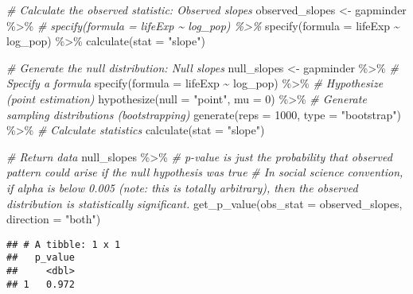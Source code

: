 \documentclass[
]{book}
\newenvironment{Shaded}{\begin{snugshade}}{\end{snugshade}}
\newcommand{\AttributeTok}[1]{\textcolor[rgb]{0.77,0.63,0.00}{#1}}
\newcommand{\CommentTok}[1]{\textcolor[rgb]{0.56,0.35,0.01}{\textit{#1}}}
\newcommand{\DecValTok}[1]{\textcolor[rgb]{0.00,0.00,0.81}{#1}}
\newcommand{\FunctionTok}[1]{\textcolor[rgb]{0.00,0.00,0.00}{#1}}
\newcommand{\NormalTok}[1]{#1}
\newcommand{\OtherTok}[1]{\textcolor[rgb]{0.56,0.35,0.01}{#1}}
\newcommand{\SpecialCharTok}[1]{\textcolor[rgb]{0.00,0.00,0.00}{#1}}
\newcommand{\StringTok}[1]{\textcolor[rgb]{0.31,0.60,0.02}{#1}}
\begin{document}
\begin{Shaded}
\begin{Highlighting}[]
\CommentTok{\# Calculate the observed statistic: Observed slopes }
\NormalTok{observed\_slopes }\OtherTok{\textless{}{-}}\NormalTok{ gapminder }\SpecialCharTok{\%\textgreater{}\%}
  \CommentTok{\# specify(formula = lifeExp \textasciitilde{} log\_pop) \%\textgreater{}\% }
  \FunctionTok{specify}\NormalTok{(}\AttributeTok{formula =}\NormalTok{ lifeExp }\SpecialCharTok{\textasciitilde{}}\NormalTok{ log\_pop) }\SpecialCharTok{\%\textgreater{}\%}
  \FunctionTok{calculate}\NormalTok{(}\AttributeTok{stat =} \StringTok{"slope"}\NormalTok{)}

\CommentTok{\# Generate the null distribution: Null slopes }
\NormalTok{null\_slopes }\OtherTok{\textless{}{-}}\NormalTok{ gapminder }\SpecialCharTok{\%\textgreater{}\%}
  \CommentTok{\# Specify a formula}
  \FunctionTok{specify}\NormalTok{(}\AttributeTok{formula =}\NormalTok{ lifeExp }\SpecialCharTok{\textasciitilde{}}\NormalTok{ log\_pop) }\SpecialCharTok{\%\textgreater{}\%}
  \CommentTok{\# Hypothesize (point estimation)}
  \FunctionTok{hypothesize}\NormalTok{(}\AttributeTok{null =} \StringTok{"point"}\NormalTok{, }\AttributeTok{mu =} \DecValTok{0}\NormalTok{) }\SpecialCharTok{\%\textgreater{}\%}
  \CommentTok{\# Generate sampling distributions (bootstrapping)}
  \FunctionTok{generate}\NormalTok{(}\AttributeTok{reps =} \DecValTok{1000}\NormalTok{, }\AttributeTok{type =} \StringTok{"bootstrap"}\NormalTok{) }\SpecialCharTok{\%\textgreater{}\%}
  \CommentTok{\# Calculate statistics }
  \FunctionTok{calculate}\NormalTok{(}\AttributeTok{stat =} \StringTok{"slope"}\NormalTok{) }

\CommentTok{\# Return data }
\NormalTok{null\_slopes }\SpecialCharTok{\%\textgreater{}\%}
  \CommentTok{\# p{-}value is just the probability that observed pattern could arise if the null hypothesis was true }
  \CommentTok{\# In social science convention, if alpha is below 0.005 (note: this is totally arbitrary), then the observed distribution is statistically significant.}
  \FunctionTok{get\_p\_value}\NormalTok{(}\AttributeTok{obs\_stat =}\NormalTok{ observed\_slopes, }
              \AttributeTok{direction =} \StringTok{"both"}\NormalTok{)}
\end{Highlighting}
\end{Shaded}

\begin{verbatim}
## # A tibble: 1 x 1
##   p_value
##     <dbl>
## 1   0.972
\end{verbatim}
\end{document}
